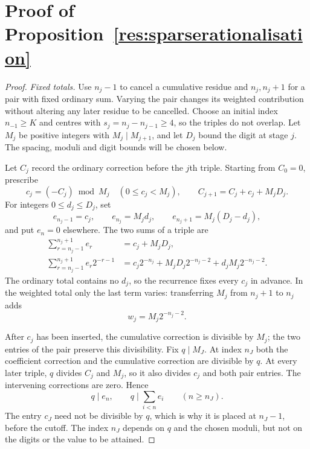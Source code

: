 \documentclass[11pt]{article}
\begin{document}
\section{Proof of Proposition~\ref{res:sparserationalisation}}\label{sec:construction}
\begin{proof}
\emph{Fixed totals.}
Use $n_j-1$ to cancel a cumulative residue and $n_j,n_j+1$ for a
pair with fixed ordinary sum.  Varying the pair changes its weighted
contribution without altering any later residue to be cancelled.
Choose an initial index $n_{-1}\ge K$ and centres with
$s_j=n_j-n_{j-1}\ge4$, so the triples do not overlap.  Let
$M_j$ be positive integers with $M_j\mid M_{j+1}$, and let $D_j$
bound the digit at stage $j$.  The spacing, moduli and digit bounds
will be chosen below.

Let $C_j$ record the ordinary correction before the $j$th triple.
Starting from $C_0=0$, prescribe
\[
 c_j=(-C_j)\bmod M_j\quad(0\le c_j<M_j),\qquad
 C_{j+1}=C_j+c_j+M_jD_j.
\]
For integers $0\le d_j\le D_j$, set
\begin{equation}\label{eq:correction-triple}
 e_{n_j-1}=c_j,\qquad e_{n_j}=M_jd_j,\qquad
 e_{n_j+1}=M_j(D_j-d_j),
\end{equation}
and put $e_n=0$ elsewhere.  The two sums of a triple are
\[
 \begin{aligned}
 \sum_{r=n_j-1}^{n_j+1}e_r
    &=c_j+M_jD_j,\\
 \sum_{r=n_j-1}^{n_j+1}e_r2^{-r-1}
    &=c_j2^{-n_j}+M_jD_j2^{-n_j-2}+d_jM_j2^{-n_j-2}.
 \end{aligned}
\]
The ordinary total contains no $d_j$, so the recurrence fixes every
$c_j$ in advance.  In the weighted total only the last term varies:
transferring $M_j$ from $n_j+1$ to $n_j$ adds
\[
 w_j=M_j2^{-n_j-2}.
\]

After $c_j$ has been inserted, the cumulative correction is divisible
by $M_j$; the two entries of the pair preserve this divisibility.
Fix $q\mid M_J$.  At index $n_J$ both the coefficient correction and
the cumulative correction are divisible by $q$.  At every later
triple, $q$ divides $C_j$ and $M_j$, so it also divides $c_j$ and
both pair entries.  The intervening corrections are zero.  Hence
\[
 q\mid e_n,\qquad q\mid\sum_{i<n}e_i\qquad(n\ge n_J).
\]
The entry $c_J$ need not be divisible by $q$, which is why it is placed at
$n_J-1$, before the cutoff.  The index $n_J$ depends on $q$ and the chosen
moduli, but not on the digits or the value to be attained.


\end{proof}
\end{document}
